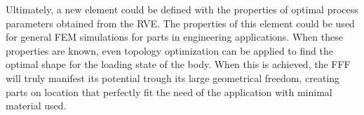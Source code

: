 Ultimately, a new element could be defined with the properties of optimal process parameters obtained from the RVE. The properties of this element could be used for general FEM simulations for parts in engineering applications. When these properties are known, even topology optimization can be applied to find the optimal shape for the loading state of the body. 
When this is achieved, the FFF will truly manifest its potential trough its large geometrical freedom, creating parts on location that perfectly fit the need of the application with minimal material used. 

